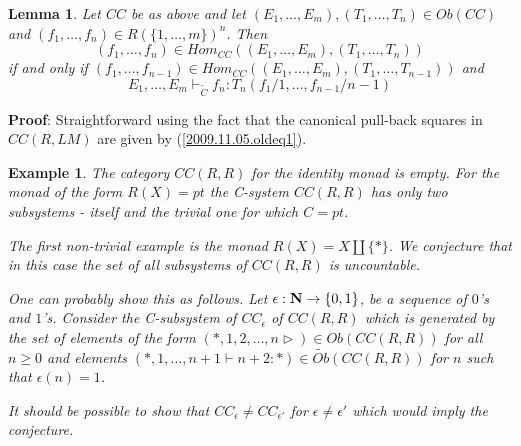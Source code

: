 \documentclass[11pt]{article}
\newenvironment{proof}{{\bf Proof}:}{\vskip 5mm }
\newtheorem{lemma}[proposition]{Lemma}
\newtheorem{example}[proposition]{Example}
\newcommand{\llabel}[1]{\label{#1}}
\newcommand{\sr}{\rightarrow}
\newcommand{\nn}{{\bf N\rm}}
\newcommand{\wt}{\widetilde}
\begin{document}
\begin{lemma}
\llabel{2009.11.05.l1}
Let $CC$ be as above and let $(E_1,\dots, E_m), (T_1,\dots,T_n)\in Ob(CC)$ and $(f_1,\dots,f_n)\in R(\{1,\dots,m\})^n$. Then  
%
$$(f_1,\dots,f_n)\in Hom_{CC}((E_1,\dots, E_m), (T_1,\dots,T_n))$$
%
if and only if $(f_1,\dots,f_{n-1})\in Hom_{CC}((E_1,\dots, E_m), (T_1,\dots,T_{n-1}))$ and 
%
$$E_1,\dots,E_m\vdash_{\wt{C}} f_n : T_{n}(f_1/1,\dots,f_{n-1}/n-1)$$
%
\end{lemma}
%
\begin{proof}
Straightforward using the fact that the canonical pull-back squares in $CC(R,LM)$ are given by (\ref{2009.11.05.oldeq1}).
\end{proof}
%
\begin{example}\rm
The category $CC(R,R)$ for the identity monad is empty. For the monad of the form $R(X)=pt$ the C-system $CC(R,R)$ has only two subsystems - itself and the trivial one for which $C={pt}$. 

The first non-trivial example is the monad $R(X)=X\amalg \{*\}$. We conjecture that in this case the set of all subsystems of $CC(R,R)$ is {\em uncountable}.

One can probably show this as follows. Let $\epsilon:\nn\sr\{0,1\}$, be a sequence of $0$'s and $1$'s. Consider the C-subsystem of $CC_{\epsilon}$ of $CC(R,R)$ which is generated by the set of elements of the form $(*, 1, 2, \dots, n\rhd)\in Ob(CC(R,R))$ for all $n\ge 0$ and elements $(*,1,\dots,n+1\vdash n+2:*)\in \wt{Ob}(CC(R,R))$ for $n$ such that $\epsilon(n)=1$. 

It should be possible to show that $CC_{\epsilon}\ne CC_{\epsilon'}$ for $\epsilon\ne \epsilon'$ which would imply the conjecture. 
\end{example}
\end{document}
